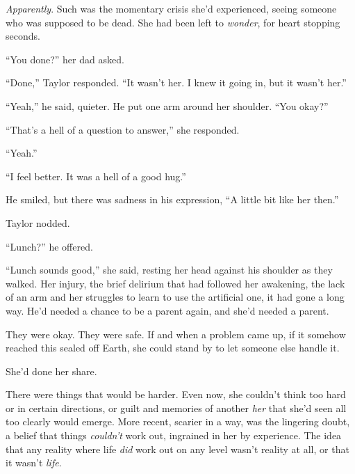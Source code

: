 \emph{Apparently}.  Such was the momentary crisis she'd experienced, seeing someone who was supposed to be dead.  She had been left to \emph{wonder}, for heart stopping seconds.



``You done?'' her dad asked.



``Done,'' Taylor responded.  ``It wasn't her.  I knew it going in, but it wasn't her.''



``Yeah,'' he said, quieter.  He put one arm around her shoulder.  ``You okay?''



``That's a hell of a question to answer,'' she responded.



``Yeah.''



``I feel better.  It was a hell of a good hug.''



He smiled, but there was sadness in his expression, ``A little bit like her then.''



Taylor nodded.



``Lunch?'' he offered.



``Lunch sounds good,'' she said, resting her head against his shoulder as they walked.  Her injury, the brief delirium that had followed her awakening, the lack of an arm and her struggles to learn to use the artificial one, it had gone a long way.  He'd needed a chance to be a parent again, and she'd needed a parent.



They were okay.  They were safe.  If and when a problem came up, if it somehow reached this sealed off Earth, she could stand by to let someone else handle it.



She'd done her share.



There were things that would be harder.  Even now, she couldn't think too hard or in certain directions, or guilt and memories of another \emph{her }that she'd seen all too clearly would emerge.  More recent, scarier in a way, was the lingering doubt, a belief that things \emph{couldn't} work out, ingrained in her by experience.  The idea that any reality where life \emph{did} work out on any level wasn't reality at all, or that it wasn't \emph{life}.



